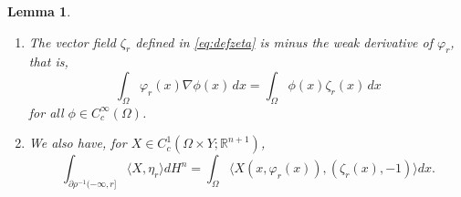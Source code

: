 \documentclass{article}
\newcommand{\R}{\mathbb{R}}
\newtheorem{lemma}[theorem]{Lemma}
\theoremstyle{definition}
\theoremstyle{remark}
\begin{document}
 \begin{lemma}\label{lem:weakderivative}
 \begin{enumerate}[label=\roman*.,ref=(\roman*)]
 The following statements are true for almost every $r\in {\mathcal R}$:
  \item \label{it:weakderivative1}The vector field $\zeta_r$ defined in \eqref{eq:defzeta} is minus the weak derivative of $\varphi_r$, that is, 
  \[\int_\Omega\varphi_r(x)\nabla\phi(x)\,dx=\int_\Omega\phi(x)\zeta_r(x)\,dx\]
  for all $\phi\in C^\infty_c(\Omega)$.
  \item \label{it:weakderivative2} We also have, for $X\in C^1_c(\Omega\times Y;\R^{n+1})$, %
  \[\int_{\partial\rho^{-1}(-\infty,r]}\langle X,\eta_r\rangle dH^n
      =\int_{\Omega}\langle X(x,\varphi_r(x)),(\zeta_r(x),-1)\rangle dx.\]
  \end{enumerate}
 \end{lemma}
\end{document}
